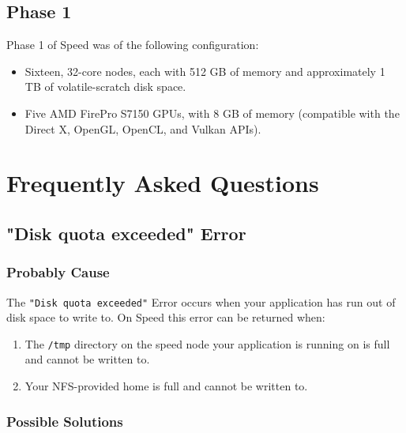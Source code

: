 \documentclass{easychair}
\begin{document}
\subsection{Phase 1}

Phase 1 of Speed was of the following configuration:

\begin{itemize}
\item
Sixteen, 32-core nodes, each with 512 GB of memory and approximately 1 TB of volatile-scratch disk space. 
\item
Five AMD FirePro S7150 GPUs, with 8 GB of memory (compatible with the Direct X, OpenGL, OpenCL, and Vulkan APIs). 
\end{itemize}

\section{Frequently Asked Questions}
\label{sect:faqs}

\subsection{"Disk quota exceeded" Error}
\subsubsection{Probably Cause}
The \texttt{"Disk quota exceeded"} Error occurs when your application has run out of disk space to write to. On Speed this error can be returned when:
\begin{enumerate}
	\item
The \texttt{/tmp} directory on the speed node your application is running on is full and cannot be written to.
	\item
Your NFS-provided home is full and cannot be written to.
\end{enumerate}

\subsubsection{Possible Solutions}
\end{document}
